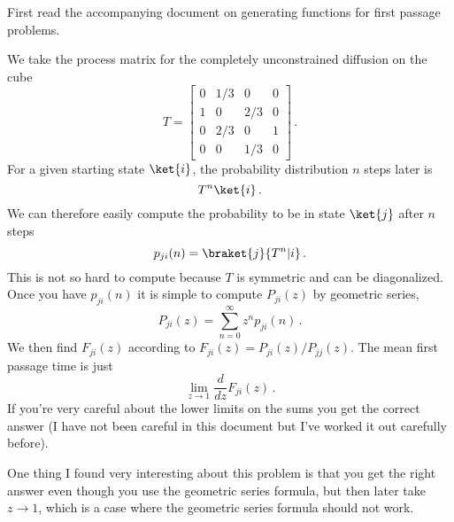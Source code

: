 \documentclass{article}
\begin{document}
First read the accompanying document on generating functions for first passage problems.

We take the process matrix for the completely unconstrained diffusion on the cube
\begin{equation}
T = \left[ \begin{matrix} 0 & 1/3 & 0 & 0 \\ 1 & 0 & 2/3 & 0 \\ 0 & 2/3 & 0 & 1 \\ 0 & 0 & 1/3 & 0\end{matrix} \right] \, .
\end{equation}
For a given starting state $\ket{i}$, the probability distribution $n$ steps later is
\begin{equation}
T^n \ket{i} \, .
\end{equation}
We can therefore easily compute the probability to be in state $\ket{j}$ after $n$ steps
\begin{equation}
p_{ji}(n) = \braket{j}{T^n | i} \, .
\end{equation}
This is not so hard to compute because $T$ is symmetric and can be diagonalized.
Once you have $p_{ji}(n)$ it is simple to compute $P_{ji}(z)$ by geometric series,
\begin{equation}
P_{ji}(z) = \sum_{n=0}^{\infty}z^n p_{ji}(n) \, .
\end{equation}
We then find $F_{ji}(z)$ according to $F_{ji}(z) = P_{ji}(z)/P_{jj}(z)$.
The mean first passage time is just
\begin{equation}
\lim_{z\rightarrow 1} \frac{d}{dz}F_{ji}(z) \, .
\end{equation}
If you're very careful about the lower limits on the sums you get the correct answer (I have not been careful in this document but I've worked it out carefully before).

One thing I found very interesting about this problem is that you get the right answer even though you use the geometric series formula, but then later take $z\rightarrow 1$, which is a case where the geometric series formula should not work.
\end{document}
